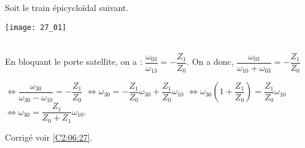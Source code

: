 \normaltrue \difficilefalse \tdifficilefalse
\correctiontrue


\setcounter{question}{0}
\ifcorrection
\else
{}
\fi

\ifprof
\else
Soit le train épicycloïdal suivant. 
\begin{center}
\texttt{[image: 27\_01]}
\end{center}
\fi


\ifprof
\else
\fi

\ifprof ~\\
 En bloquant le porte satellite, on a : $\dfrac{\omega_{03}}{\omega_{13}}=-\dfrac{Z_1}{Z_0}$. On a donc, 
$\dfrac{\omega_{03}}{\omega_{10}+\omega_{03}}=-\dfrac{Z_1}{Z_0}$

$\Leftrightarrow \dfrac{\omega_{30}}{\omega_{30}-\omega_{10}}=-\dfrac{Z_1}{Z_0}$
$\Leftrightarrow \omega_{30}=-\dfrac{Z_1}{Z_0} \omega_{30}+\dfrac{Z_1}{Z_0}\omega_{10} $
$\Leftrightarrow \omega_{30}\left( 1+\dfrac{Z_1}{Z_0} \right)=\dfrac{Z_1}{Z_0}\omega_{10} $
$\Leftrightarrow \omega_{30}=\dfrac{Z_1}{Z_0+Z_1}\omega_{10} $.
\else
\fi


\ifprof
\else
\begin{flushright}
\footnotesize{Corrigé  voir \ref{C2:06:27}.}
\end{flushright}%
\fi